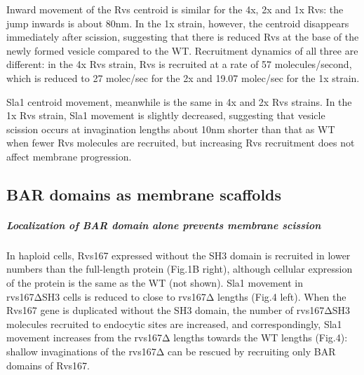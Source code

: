 			

			

			
			

			
			Inward movement of the Rvs centroid is similar for the 4x, 2x and 1x Rvs: the jump inwards is about 80nm. In the 1x strain, however, the centroid disappears immediately after scission, suggesting that there is reduced Rvs at the base of the newly formed vesicle compared to the WT. Recruitment dynamics of all three are different: in the 4x Rvs strain, Rvs is recruited at a rate of 57 molecules/second, which is reduced to 27 molec/sec for the 2x and 19.07 molec/sec for the 1x strain. 
		
			\vspace{5mm}
			 Sla1 centroid movement, meanwhile is the same in 4x and 2x Rvs strains. In the 1x Rvs strain, Sla1 movement is slightly decreased, suggesting that vesicle scission occurs at invagination lengths about 10nm shorter than that as WT when fewer Rvs molecules are recruited, but increasing Rvs recruitment does not affect membrane progression. 




	
	\subsection{BAR domains as membrane scaffolds}
		\subparagraph{Localization of BAR domain alone prevents membrane scission}
		 In haploid cells, Rvs167 expressed without the SH3 domain is recruited in lower numbers than the full-length protein (Fig.1B right), although cellular expression of the protein is the same as the WT (not shown). Sla1 movement in rvs167ΔSH3 cells is reduced to close to rvs167Δ lengths (Fig.4 left). When the Rvs167 gene is duplicated without the SH3 domain, the number of rvs167ΔSH3 molecules recruited to endocytic sites are increased, and correspondingly, Sla1 movement increases from the rvs167Δ lengths towards the WT lengths (Fig.4): shallow invaginations of the rvs167Δ can be rescued by recruiting only BAR domains of Rvs167.
		 
